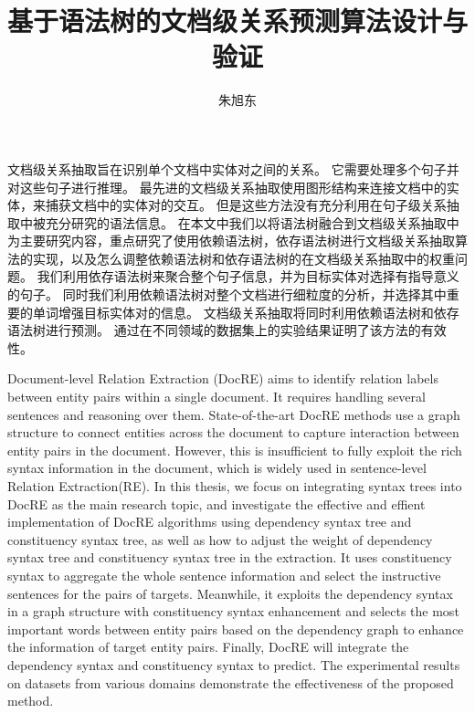 \documentclass[bachelor]{thesis-uestc}
\title{基于语法树的文档级关系预测算法设计与验证}{Design and Verification of Document-level Relation Extraction Algorithm Based on Syntax Tree}
\author{朱旭东}{Xudong Zhu}
\begin{document}
\makecover

\begin{chineseabstract}
    文档级关系抽取旨在识别单个文档中实体对之间的关系。
    它需要处理多个句子并对这些句子进行推理。
    最先进的文档级关系抽取使用图形结构来连接文档中的实体，来捕获文档中的实体对的交互。 
    但是这些方法没有充分利用在句子级关系抽取中被充分研究的语法信息。
    在本文中我们以将语法树融合到文档级关系抽取中为主要研究内容，重点研究了使用依赖语法树，依存语法树进行文档级关系抽取算法的实现，以及怎么调整依赖语法树和依存语法树的在文档级关系抽取中的权重问题。
    我们利用依存语法树来聚合整个句子信息，并为目标实体对选择有指导意义的句子。
    同时我们利用依赖语法树对整个文档进行细粒度的分析，并选择其中重要的单词增强目标实体对的信息。
    文档级关系抽取将同时利用依赖语法树和依存语法树进行预测。
    通过在不同领域的数据集上的实验结果证明了该方法的有效性。 


\end{chineseabstract}

\begin{englishabstract}
    Document-level Relation Extraction (DocRE) aims to identify relation labels between entity pairs within a single document. 
    It requires handling several sentences and reasoning over them.
    State-of-the-art DocRE methods use a graph structure to connect entities across the document to capture interaction between entity pairs in the document.
    However, this is insufficient to fully exploit the rich syntax information in the document, which is widely used in sentence-level Relation Extraction(RE). 
    In this thesis, we focus on integrating syntax trees into DocRE as the main research topic, and investigate the effective and effient implementation of DocRE algorithms using dependency syntax tree and constituency syntax tree, as well as how to adjust the weight of dependency syntax tree and constituency syntax tree in the extraction. 
    It uses constituency syntax to aggregate the whole sentence information and select the instructive sentences for the pairs of targets. 
    Meanwhile, it exploits the dependency syntax in a graph structure with constituency syntax enhancement and selects the most important words between entity pairs based on the dependency graph to enhance the information of target entity pairs. 
    Finally, DocRE will integrate the dependency syntax and constituency syntax to predict.
    The experimental results on datasets from various domains demonstrate the effectiveness of the proposed method.


\end{englishabstract}
\end{document}
